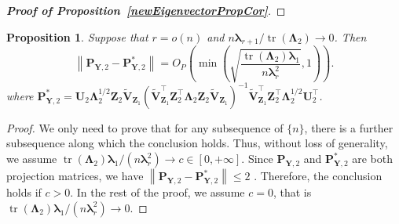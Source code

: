 \documentclass[12pt]{article} %
\DeclareMathOperator{\mytr}{tr}
\DeclareMathOperator{\myrank}{Rank}
\newcommand{\bZ}{\mathbf{Z}}
\newcommand{\bP}{\mathbf{P}}
\newcommand{\bY}{\mathbf{Y}}
\newcommand{\bU}{\mathbf{U}}
\newcommand{\bV}{\mathbf{V}}
\newcommand{\bfsym}[1]{\ensuremath{\boldsymbol{#1}}}
\def\blambda {\bfsym {\lambda}}
\def\bLambda {\bfsym {\Lambda}}
\newtheorem{proposition}{Proposition}
\theoremstyle{definition}
\newtheorem{remark}{Remark}
\begin{document}
\begin{appendices}
\begin{proof}[\textbf{Proof of Proposition~\ref{newEigenvectorPropCor}}]
\end{proof}


\begin{proposition}
    \label{eigenvectorprop2}
    Suppose that $r=o(n)$ and $n\blambda_{r+1} /\mytr(\bLambda_2)\to 0$. Then
    \begin{equation*}
            \left\|
            \bP_{\bY,2}
            -
            \bP_{\bY,2}^*
            \right\|
    = 
    O_P\left(
        \min\left(
        \sqrt{\frac{\mytr(\bLambda_2) \blambda_1}{n\blambda_r^2}}
    ,1\right)
    \right)
    .
    \end{equation*}
where
$
            \bP_{\bY,2}^*=
            \bU_2 \bLambda_2^{1/2}\bZ_{2} \tilde{\bV}_{\bZ_1}
            \left(\tilde{\bV}_{\bZ_1}^\top \bZ_2^\top \bLambda_2 \bZ_2 \tilde{\bV}_{\bZ_1}\right)^{-1}
            \tilde{\bV}_{\bZ_1}^\top \bZ_2^\top \bLambda_2^{1/2} \bU_2^\top
            $.
\end{proposition}
\begin{proof}
    We only need to prove that for any subsequence of $\{n\}$, there is a further subsequence along which the conclusion holds.
    Thus, without loss of generality, we assume $\mytr(\bLambda_2)\blambda_1 /{(n \blambda_r^2)}\to c\in [0,+\infty]$.
    Since $
    \bP_{\bY,2}
    $ and 
    $
    \bP_{\bY,2}^*
            $
            are both projection matrices, we have
            $
            \left\|
    \bP_{\bY,2}
    -
            \bP_{\bY,2}^*
            \right\|
            \leq 2
            $
    .
    Therefore, the conclusion holds if $c>0$.
    In the rest of the proof, we assume $c=0$, that is $\mytr(\bLambda_2)\blambda_1 /{(n \blambda_r^2)}\to 0$.



\end{proof}
\end{appendices}
\end{document}
